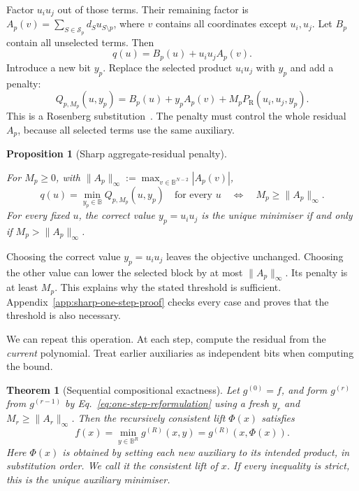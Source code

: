 \documentclass[a4paper,onecolumn,11pt,unpublished]{quantumarticle}
\newtheorem{theorem}[theorem]{Theorem}
\newtheorem{proposition}[proposition]{Proposition}
\theoremstyle{remark}
\begin{document}
Factor $u_i u_j$ out of those terms. Their remaining factor is
$A_p(v)=\sum_{S\in\mathcal S_p}d_Su_{S\setminus p}$, where $v$ contains
all coordinates except $u_i,u_j$. Let $B_p$ contain all unselected terms.
Then
\begin{equation}
q(u)=B_p(u)+u_i u_jA_p(v).
\label{eq:aggregate-residual-decomposition}
\end{equation}
Introduce a new bit $y_p$. Replace the selected product $u_i u_j$ with $y_p$
and add a penalty:
\begin{equation}
Q_{p,M_p}(u,y_p)=B_p(u)+y_pA_p(v)+M_pP_{\mathrm R}(u_i,u_j,y_p).
\label{eq:one-step-reformulation}
\end{equation}
This is a Rosenberg substitution~\cite{Rosenberg1975,BorosGruber2014}.
The penalty must control the whole residual $A_p$, because all selected
terms use the same auxiliary.

\begin{proposition}[Sharp aggregate-residual penalty]
\label{prop:sharp-aggregate-residual}
\leavevmode\par
For $M_p\geq0$, with $\|A_p\|_\infty:=\max_{v\in\mathbb B^{N-2}}|A_p(v)|$,
\begin{equation}
q(u)=\min_{y_p\in\mathbb B}Q_{p,M_p}(u,y_p)\quad\text{for every }u
\quad\Longleftrightarrow\quad M_p\geq\|A_p\|_\infty.
\label{eq:sharp-one-step-threshold}
\end{equation}
For every fixed $u$, the correct value $y_p=u_i u_j$ is the unique minimiser
if and only if $M_p>\|A_p\|_\infty$.
\end{proposition}

Choosing the correct value $y_p=u_i u_j$ leaves the objective unchanged.
Choosing the other value can lower the selected block by at most
$\|A_p\|_\infty$. Its penalty is at least $M_p$. This explains why the
stated threshold is sufficient. Appendix~\ref{app:sharp-one-step-proof}
checks every case and proves that the threshold is also necessary.

We can repeat this operation. At each step, compute the residual from the
\emph{current} polynomial. Treat earlier auxiliaries as independent bits
when computing the bound.

\begin{theorem}[Sequential compositional exactness]
\label{thm:sequential-compositional-exactness}
Let $g^{(0)}=f$, and form $g^{(r)}$ from $g^{(r-1)}$ by
Eq.~\eqref{eq:one-step-reformulation} using a fresh $y_r$ and
$M_r\geq\|A_r\|_\infty$. Then the recursively consistent lift $\Phi(x)$ satisfies
\begin{equation}
f(x)=\min_{y\in\mathbb B^R}g^{(R)}(x,y)=g^{(R)}(x,\Phi(x)).
\label{eq:compositional-exactness}
\end{equation}
Here $\Phi(x)$ is obtained by setting each new auxiliary to its intended
product, in substitution order. We call it the consistent lift of $x$.
If every inequality is strict, this is the unique auxiliary minimiser.
\end{theorem}
\end{document}
